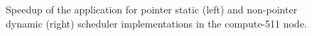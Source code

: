 \begin{figure}[!htp]
	\begin{center}
		\caption{Speedup of the \tth application for pointer static (left) and non-pointer dynamic (right) scheduler implementations in the compute-511 node.}
		\label{fig:Speedup511}
	\end{center}
\end{figure}

